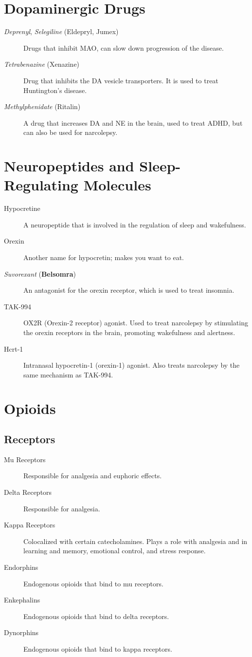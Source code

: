 \section*{Dopaminergic Drugs}
\begin{description}
    \item[\textit{Deprenyl}, \textit{Selegiline} (Eldepryl, Jumex)] Drugs that inhibit MAO, can slow down progression of the disease.
    \item[\textit{Tetrabenazine} (Xenazine)] Drug that inhibits the DA vesicle transporters. It is used to treat Huntington's disease.
    \item[\textit{Methylphenidate} (Ritalin)] A drug that increases DA and NE in the brain, used to treat ADHD, but can also be used for narcolepsy.
\end{description}

\section*{Neuropeptides and Sleep-Regulating Molecules}
\begin{description}
    \item[Hypocretine] A neuropeptide that is involved in the regulation of sleep and wakefulness.
    \item[Orexin] Another name for hypocretin; makes you want to eat.
    \item[\textit{Suvorexant} (\textbf{Belsomra})] An antagonist for the orexin receptor, which is used to treat insomnia.
    \item[TAK-994] OX2R (Orexin-2 receptor) agonist. Used to treat narcolepsy by stimulating the orexin receptors in the brain, promoting wakefulness and alertness.
    \item[Hcrt-1] Intranasal hypocretin-1 (orexin-1) agonist. Also treats narcolepsy by the same mechanism as TAK-994.
\end{description}

\section*{Opioids}
\subsection*{Receptors}
\begin{description}
    \item[Mu Receptors] Responsible for analgesia and euphoric effects. 
    \item[Delta Receptors] Responsible for analgesia.
    \item[Kappa Receptors] Colocalized with certain catecholamines. Plays a role with analgesia and in learning and memory, emotional control, and stress response.   
    \item[Endorphins] Endogenous opioids that bind to mu receptors. 
    \item[Enkephalins] Endogenous opioids that bind to delta receptors.
    \item[Dynorphins] Endogenous opioids that bind to kappa receptors.
\end{description}

